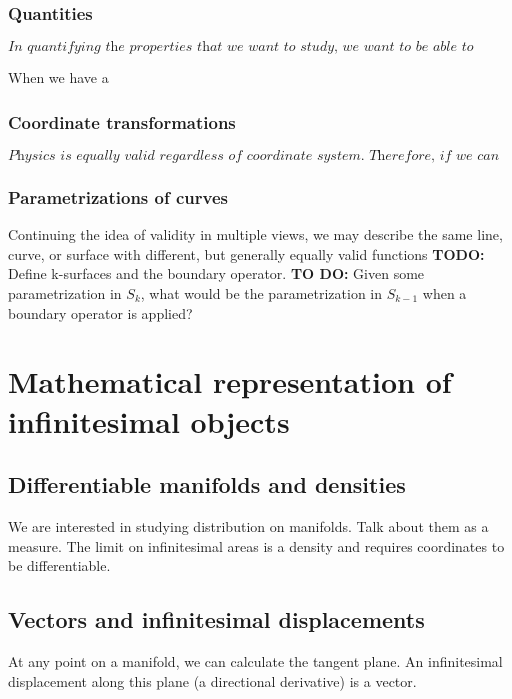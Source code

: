 \documentclass{book}
\begin{document}
\subsection{Quantities}
$\textit{In quantifying the properties that we want to study, we want to be able to compare two objects with the same "sort" of property, and maybe we also want to identify multiple parameters at the same time.}$

When we have a 
\subsection{Coordinate transformations}
$\textit{Physics is equally valid regardless of coordinate system. Therefore, if we can describe a physical phenomenon in one frame of reference, we should be able to convert that description into another frame of reference. }$
 


\subsection{Parametrizations of curves}
Continuing the idea of validity in multiple views, we may describe the same line, curve, or surface with different, but generally equally valid functions
\textbf{TODO: } Define k-surfaces and the boundary operator.
\textbf{TO DO:} Given some parametrization in $S_{k}$, what would be the parametrization in $S_{k-1}$ when a boundary operator is applied?

\chapter{Mathematical representation of infinitesimal objects}

\section{Differentiable manifolds and densities}
We are interested in studying distribution on manifolds. Talk about them as a measure. The limit on infinitesimal areas is a density and requires coordinates to be differentiable.

\section{Vectors and infinitesimal displacements}
At any point on a manifold, we can calculate the tangent plane. An infinitesimal displacement along this plane (a directional derivative) is a vector. 
\end{document}
